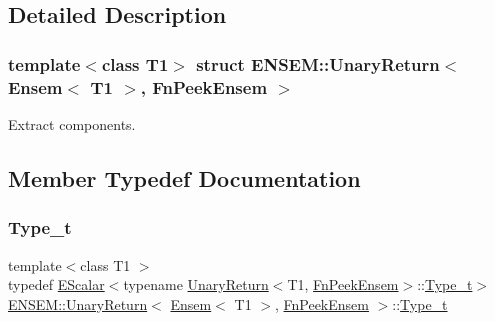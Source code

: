 \subsection{Detailed Description}
\subsubsection*{template$<$class T1$>$\newline
struct E\+N\+S\+E\+M\+::\+Unary\+Return$<$ Ensem$<$ T1 $>$, Fn\+Peek\+Ensem $>$}

Extract components. 

\subsection{Member Typedef Documentation}
\mbox{\label{structENSEM_1_1UnaryReturn_3_01Ensem_3_01T1_01_4_00_01FnPeekEnsem_01_4_a3bb59903a0e3c8d5e4b6ce0ac99c5454}} 
\subsubsection{\texorpdfstring{Type\_t}{Type\_t}\hspace{0.1cm}{\footnotesize\ttfamily [1/3]}}
{\footnotesize\ttfamily template$<$class T1 $>$ \\
typedef \mbox{\hyperlink{classENSEM_1_1EScalar}{E\+Scalar}}$<$typename \mbox{\hyperlink{structENSEM_1_1UnaryReturn}{Unary\+Return}}$<$T1, \mbox{\hyperlink{structENSEM_1_1FnPeekEnsem}{Fn\+Peek\+Ensem}}$>$\+::\mbox{\hyperlink{structENSEM_1_1UnaryReturn_3_01Ensem_3_01T1_01_4_00_01FnPeekEnsem_01_4_a3bb59903a0e3c8d5e4b6ce0ac99c5454}{Type\+\_\+t}}$>$ \mbox{\hyperlink{structENSEM_1_1UnaryReturn}{E\+N\+S\+E\+M\+::\+Unary\+Return}}$<$ \mbox{\hyperlink{classENSEM_1_1Ensem}{Ensem}}$<$ T1 $>$, \mbox{\hyperlink{structENSEM_1_1FnPeekEnsem}{Fn\+Peek\+Ensem}} $>$\+::\mbox{\hyperlink{structENSEM_1_1UnaryReturn_3_01Ensem_3_01T1_01_4_00_01FnPeekEnsem_01_4_a3bb59903a0e3c8d5e4b6ce0ac99c5454}{Type\+\_\+t}}}

\mbox{\label{structENSEM_1_1UnaryReturn_3_01Ensem_3_01T1_01_4_00_01FnPeekEnsem_01_4_a3bb59903a0e3c8d5e4b6ce0ac99c5454}} 
